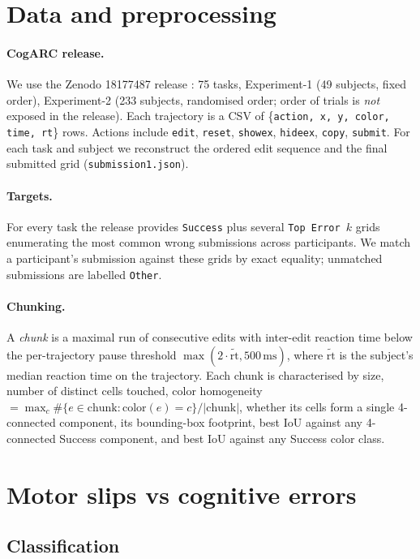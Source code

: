 \documentclass[11pt]{article}
\begin{document}
\section{Data and preprocessing}
\label{sec:data}

\paragraph{CogARC release.}
We use the Zenodo 18177487 release \cite{cogarc2024}: 75 tasks,
Experiment-1 (49 subjects, fixed order), Experiment-2 (233 subjects,
randomised order; order of trials is \emph{not} exposed in the
release). Each trajectory is a CSV of \{\texttt{action, x, y, color,
time, rt}\} rows. Actions include \texttt{edit}, \texttt{reset},
\texttt{showex}, \texttt{hideex}, \texttt{copy}, \texttt{submit}.
For each task and subject we reconstruct the ordered edit sequence
and the final submitted grid (\texttt{submission1.json}).

\paragraph{Targets.}
For every task the release provides \texttt{Success} plus several
\texttt{Top Error $k$} grids enumerating the most common wrong
submissions across participants. We match a participant's submission
against these grids by exact equality; unmatched submissions are
labelled \texttt{Other}.

\paragraph{Chunking.}
A \emph{chunk} is a maximal run of consecutive edits with
inter-edit reaction time below the per-trajectory pause threshold
$\max(2 \cdot \tilde{\text{rt}}, 500\,\text{ms})$, where
$\tilde{\text{rt}}$ is the subject's median reaction time on the
trajectory. Each chunk is characterised by size, number of distinct
cells touched, color homogeneity
$= \max_c \#\{e\in \text{chunk}:\text{color}(e){=}c\} / |\text{chunk}|$,
whether its cells form a single 4-connected component, its
bounding-box footprint, best IoU against any 4-connected Success
component, and best IoU against any Success color class.


\section{Motor slips vs cognitive errors}
\label{sec:motor}

\subsection{Classification}
\end{document}
